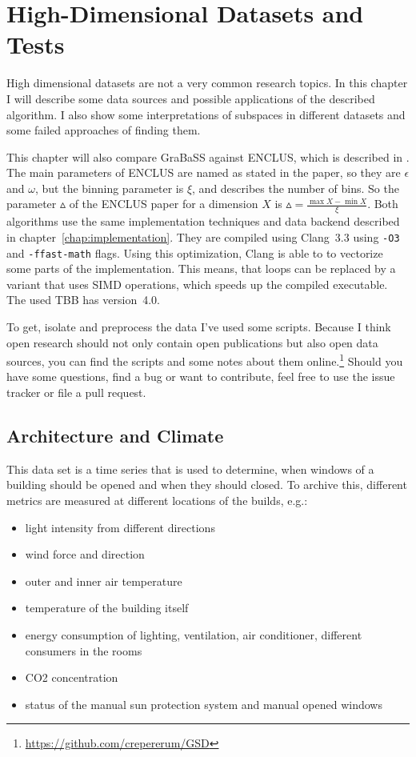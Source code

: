 \chapter{High-Dimensional Datasets and Tests}
High dimensional datasets are not a very common research topics. In this chapter I will describe some data sources and possible applications of the described algorithm. I also show some interpretations of subspaces in different datasets and some failed approaches of finding them.

This chapter will also compare GraBaSS against ENCLUS, which is described in \cite{enclus}. The main parameters of ENCLUS are named as stated in the paper, so they are $\epsilon$ and $\omega$, but the binning parameter is $\xi$, and describes the number of bins. So the parameter $\vartriangle$ of the ENCLUS paper for a dimension $X$ is $\vartriangle = \frac{\max{X} - \min{X}}{\xi}$. Both algorithms use the same implementation techniques and data backend described in chapter~\ref{chap:implementation}. They are compiled using Clang~3.3 using \texttt{-O3} and \texttt{-ffast-math} flags. Using this optimization, Clang is able to to vectorize some parts of the implementation. This means, that loops can be replaced by a variant that uses SIMD operations, which speeds up the compiled executable. The used TBB has version~4.0.

To get, isolate and preprocess the data I've used some scripts. Because I think open research should not only contain open publications but also open data sources, you can find the scripts and some notes about them online.\footnote{\url{https://github.com/crepererum/GSD}} Should you have some questions, find a bug or want to contribute, feel free to use the issue tracker or file a pull request.

\section{Architecture and Climate}
This data set is a time series that is used to determine, when windows of a building should be opened and when they should closed. To archive this, different metrics are measured at different locations of the builds, e.g.:
\begin{itemize}
	\item light intensity from different directions
	\item wind force and direction
	\item outer and inner air temperature
	\item temperature of the building itself
	\item energy consumption of lighting, ventilation, air conditioner, different consumers in the rooms
	\item CO2 concentration
	\item status of the manual sun protection system and manual opened windows
\end{itemize}

